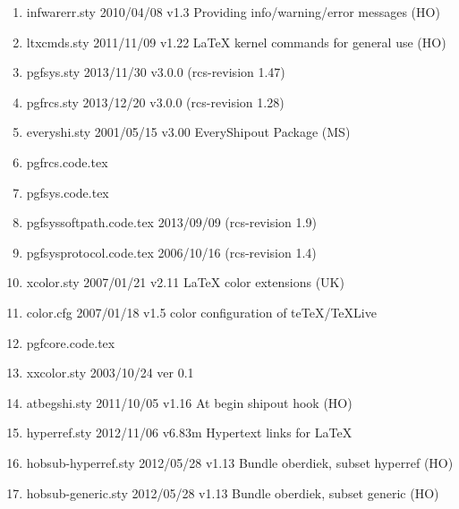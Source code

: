 \begin{enumerate}
\item infwarerr.sty 2010/04/08 v1.3 Providing info/warning/error messages (HO)
\item 		 ltxcmds.sty 2011/11/09 v1.22 LaTeX kernel commands for general use (HO)
\item 		 pgfsys.sty 2013/11/30 v3.0.0 (rcs-revision 1.47)
\item 		 pgfrcs.sty 2013/12/20 v3.0.0 (rcs-revision 1.28)
\item 		 everyshi.sty 2001/05/15 v3.00 EveryShipout Package (MS)
\item 		 pgfrcs.code.tex
\item 		 pgfsys.code.tex
\item 		 pgfsyssoftpath.code.tex 2013/09/09 (rcs-revision 1.9)
\item 		 pgfsysprotocol.code.tex 2006/10/16 (rcs-revision 1.4)
\item 		 xcolor.sty 2007/01/21 v2.11 LaTeX color extensions (UK)
\item 		 color.cfg 2007/01/18 v1.5 color configuration of teTeX/TeXLive
\item 		 pgfcore.code.tex
\item 	xxcolor.sty 2003/10/24 ver 0.1
\item 		 atbegshi.sty 2011/10/05 v1.16 At begin shipout hook (HO)
\item 		 hyperref.sty 2012/11/06 v6.83m Hypertext links for LaTeX
\item hobsub-hyperref.sty 2012/05/28 v1.13 Bundle oberdiek, subset hyperref (HO)
\item 		 hobsub-generic.sty 2012/05/28 v1.13 Bundle oberdiek, subset generic (HO)

\end{enumerate}
